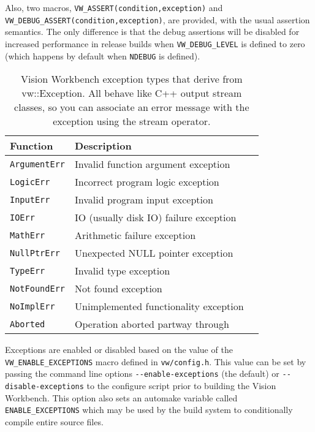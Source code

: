 Also, two macros, \verb#VW_ASSERT(condition,exception)# and
\verb#VW_DEBUG_ASSERT(condition,exception)#, are provided, with the
usual assertion semantics.  The only difference is that the debug
assertions will be disabled for increased performance in release
builds when \verb#VW_DEBUG_LEVEL# is defined to zero (which happens by
default when \verb#NDEBUG# is defined).

\begin{table}[t]\begin{centering}
\begin{tabular}{|l|l|l|} \hline
Function & Description \\ \hline \hline
\verb#ArgumentErr# & Invalid function argument exception \\ \hline
\verb#LogicErr# & Incorrect program logic exception \\ \hline
\verb#InputErr# & Invalid program input exception \\ \hline
\verb#IOErr# & IO (usually disk IO) failure exception \\ \hline
\verb#MathErr# & Arithmetic failure exception \\ \hline
\verb#NullPtrErr# & Unexpected NULL pointer exception\\ \hline
\verb#TypeErr# & Invalid type exception \\ \hline
\verb#NotFoundErr# & Not found exception \\ \hline
\verb#NoImplErr# & Unimplemented functionality exception \\ \hline
\verb#Aborted# & Operation aborted partway through \\ \hline

\end{tabular}
\caption{Vision Workbench exception types that derive from
  vw::Exception.  All behave like C++ output stream classes, so you
  can associate an error message with the exception using the
  stream operator.}
\label{tbl:exception-types}
\end{centering}\end{table}

Exceptions are enabled or disabled based on the value of the
\verb#VW_ENABLE_EXCEPTIONS# macro defined in \verb#vw/config.h#.  This
value can be set by passing the command line options
\verb#--enable-exceptions# (the default) or \verb#--disable-exceptions#
to the configure script prior to building the Vision Workbench.  This
option also sets an automake variable called \verb#ENABLE_EXCEPTIONS#
which may be used by the build system to conditionally compile entire
source files.

